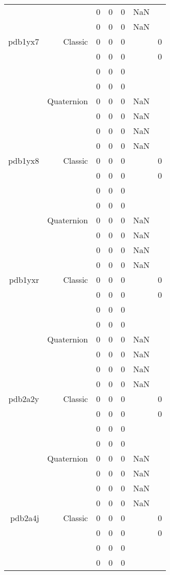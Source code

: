 \begin{xltabular}{\textwidth}{r|rcccSc}
& & 0 & 0 & 0 & NaN & \\
& & 0 & 0 & 0 & NaN & \\ \addlinespace
pdb1yx7 & Classic & 0 & 0 & 0 & & 0 \\
& & 0 & 0 & 0 & & 0 \\
& & 0 & 0 & 0 & & \\
& & 0 & 0 & 0 & & \\
& Quaternion & 0 & 0 & 0 & NaN & \\
& & 0 & 0 & 0 & NaN & \\
& & 0 & 0 & 0 & NaN & \\
& & 0 & 0 & 0 & NaN & \\ \addlinespace
pdb1yx8 & Classic & 0 & 0 & 0 & & 0 \\
& & 0 & 0 & 0 & & 0 \\
& & 0 & 0 & 0 & & \\
& & 0 & 0 & 0 & & \\
& Quaternion & 0 & 0 & 0 & NaN & \\
& & 0 & 0 & 0 & NaN & \\
& & 0 & 0 & 0 & NaN & \\
& & 0 & 0 & 0 & NaN & \\ \addlinespace
pdb1yxr & Classic & 0 & 0 & 0 & & 0 \\
& & 0 & 0 & 0 & & 0 \\
& & 0 & 0 & 0 & & \\
& & 0 & 0 & 0 & & \\
& Quaternion & 0 & 0 & 0 & NaN & \\
& & 0 & 0 & 0 & NaN & \\
& & 0 & 0 & 0 & NaN & \\
& & 0 & 0 & 0 & NaN & \\ \addlinespace
pdb2a2y & Classic & 0 & 0 & 0 & & 0 \\
& & 0 & 0 & 0 & & 0 \\
& & 0 & 0 & 0 & & \\
& & 0 & 0 & 0 & & \\
& Quaternion & 0 & 0 & 0 & NaN & \\
& & 0 & 0 & 0 & NaN & \\
& & 0 & 0 & 0 & NaN & \\
& & 0 & 0 & 0 & NaN & \\ \addlinespace
pdb2a4j & Classic & 0 & 0 & 0 & & 0 \\
& & 0 & 0 & 0 & & 0 \\
& & 0 & 0 & 0 & & \\
& & 0 & 0 & 0 & & \\

\end{xltabular}
